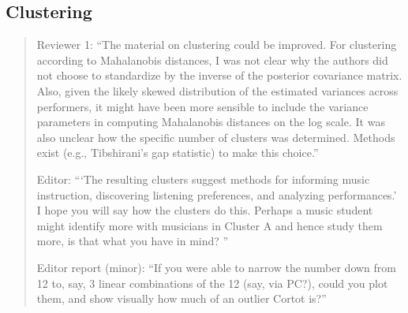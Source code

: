\documentclass[12pt]{article}
\begin{document}
\subsection*{Clustering}

\begin{quote}
  Reviewer 1: ``The material on clustering could be improved. For clustering according to Mahalanobis distances, I was not clear why the authors did not choose to standardize by the inverse of the posterior covariance matrix. Also, given the likely skewed distribution of the estimated variances across performers, it might have been more sensible to include the variance parameters in computing Mahalanobis distances on the log scale. It was also unclear how the specific number of clusters was determined. Methods exist (e.g., Tibshirani’s gap statistic) to make this choice.''
  
  Editor: ```The resulting clusters suggest methods for informing music 
  instruction, discovering listening preferences, and analyzing 
  performances.'  I hope you will say how the clusters do this.
  Perhaps a music student might identify more with musicians in
  Cluster A and hence study them more, is that what you have in
  mind? ''

  Editor report (minor): ``If you were able to narrow
  the number down from 12 to, say, 3 linear combinations of the 12 (say, via
  PC?), could you plot them, and show visually how much of an outlier Cortot is?''
\end{quote}
\end{document}
